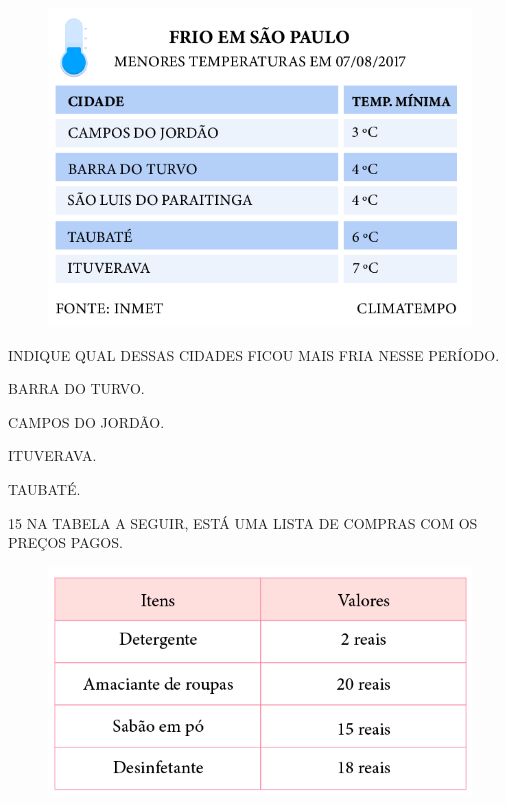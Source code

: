 \begin{figure}[htpb!]
\includegraphics[width=\textwidth]{../ilustracoes/MAT1/SAEB_1ANO_MAT_FIGURA119.png}
\end{figure}

INDIQUE QUAL DESSAS CIDADES FICOU MAIS FRIA NESSE PERÍODO.

\begin{escolha}
\item BARRA DO TURVO.

\item CAMPOS DO JORDÃO.

\item ITUVERAVA.

\item TAUBATÉ.
\end{escolha}


\pagebreak
\num{15} NA TABELA A SEGUIR, ESTÁ UMA LISTA DE COMPRAS COM OS PREÇOS PAGOS.

\begin{figure}[htpb!]
\includegraphics[width=\textwidth]{../ilustracoes/MAT1/SAEB_1ANO_MAT_FIGURA120.png}
\end{figure}


